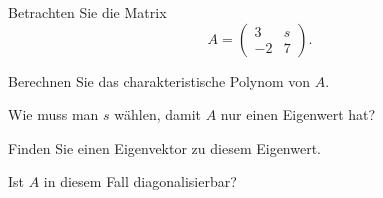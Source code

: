Betrachten Sie die Matrix
\[
A=\begin{pmatrix}3&s\\-2&7\end{pmatrix}.
\]

\begin{teilaufgaben}
\item
Berechnen Sie das charakteristische Polynom von $A$.
\item
Wie muss man $s$ wählen, damit $A$ nur einen Eigenwert hat?
\item
Finden Sie einen Eigenvektor zu diesem Eigenwert.
\item
Ist $A$ in diesem Fall diagonalisierbar?
\end{teilaufgaben}


